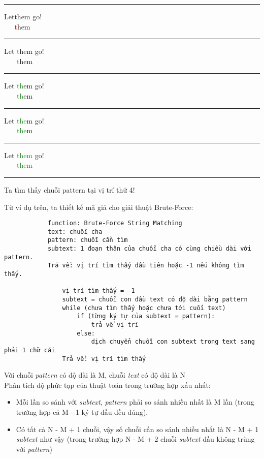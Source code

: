 \documentclass[a4paper,11pt]{article}
\begin{document}
\begin{enumerate}
			\vspace*{2mm}
			\hrule
			Let\textcolor{red}{\textvisiblespace}them go!\\
			\textcolor{white}{Let}\textcolor{red}{t}hem
			
			\vspace*{2mm}
			\hrule
			Let \textcolor{ForestGreen}{t}hem go!\\
			\textcolor{white}{Let }\textcolor{ForestGreen}{t}hem

			\vspace*{2mm}
			\hrule
			Let \textcolor{ForestGreen}{th}em go!\\
			\textcolor{white}{Let }\textcolor{ForestGreen}{th}em
			
			\vspace*{2mm}
			\hrule
			Let \textcolor{ForestGreen}{the}m go!\\
			\textcolor{white}{Let }\textcolor{ForestGreen}{the}m
						
			\vspace*{2mm}
			\hrule
			Let \textcolor{ForestGreen}{them} go!\\
			\textcolor{white}{Let }\textcolor{ForestGreen}{them}
			\vspace*{2mm}
			\hrule

			Ta tìm thấy chuỗi pattern tại vị trí thứ 4!
			
			\vspace*{4mm}
			
			Từ ví dụ trên, ta thiết kế mã giả cho giải thuật Brute-Force:

			\begin{lstlisting}
			function: Brute-Force String Matching
			text: chuỗi cha 
			pattern: chuỗi cần tìm 
			subtext: 1 đoạn thân của chuỗi cha có cùng chiều dài với pattern.
			Trả về: vị trí tìm thấy đầu tiên hoặc -1 nếu không tìm thấy.
			
				vị trí tìm thấy = -1
				subtext = chuỗi con đầu text có độ dài bằng pattern
				while (chưa tìm thấy hoặc chưa tới cuối text)
					if (từng ký tự của subtext = pattern):
						trả về vị trí
					else:
						dịch chuyển chuỗi con subtext trong text sang phải 1 chữ cái
				Trả về: vị trí tìm thấy
					\end{lstlisting}
			
			Với chuỗi \textit{pattern} có độ dài là M, chuỗi \textit{text} có độ dài là N \\
			Phân tích độ phức tạp của thuật toán trong trường hợp xấu nhất:
			\begin{itemize}
				\item Mỗi lần so sánh với \textit{subtext}, \textit{pattern} phải so sánh nhiều nhất là M lần (trong trường hợp cả M - 1 ký tự đầu đều đúng).
				\item Có tất cả N - M + 1 chuỗi, vậy số chuỗi cần so sánh nhiều nhất là N - M + 1 \textit{subtext} như vậy (trong trường hợp N - M + 2 chuỗi \textit{subtext} đầu không trùng với \textit{pattern})
				

\end{itemize}
\end{enumerate}
\end{document}
